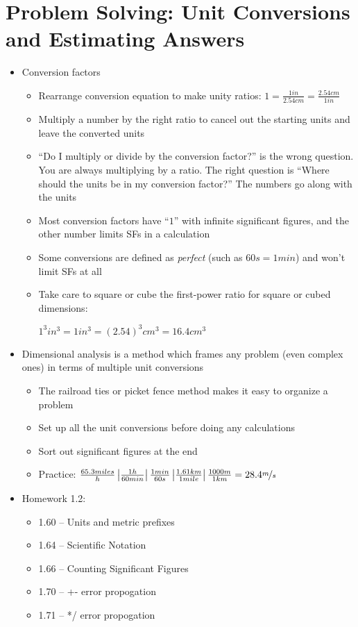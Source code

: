 \documentclass[12pt, openany, letterpaper]{memoir}
\begin{document}
\section{Problem Solving: Unit Conversions and Estimating Answers}
\begin{itemize}
	\item Conversion factors
	\begin{itemize}
		\item Rearrange conversion equation to make unity ratios: $1=\frac{1in}{2.54cm}=\frac{2.54cm}{1in}$
		\item Multiply a number by the right ratio to cancel out the starting units and leave the converted units
		\item ``Do I multiply or divide by the conversion factor?'' is the wrong question. You are always multiplying by a ratio. The right question is ``Where should the units be in my conversion factor?'' The numbers go along with the units
		\item Most conversion factors have ``$1$'' with infinite significant figures, and the other number limits SFs in a calculation
		\item Some conversions are defined as \emph{perfect} (such as $60s=1min$) and won't limit SFs at all
		\item Take care to square or cube the first-power ratio for square or cubed dimensions: 
		
		$1^3in^3=1in^3=\left(2.54\right)^3cm^3=16.4cm^3$
	\end{itemize}
	\item Dimensional analysis is a method which frames any problem (even complex ones) in terms of multiple unit conversions
	\begin{itemize}
		\item The railroad ties or picket fence method makes it easy to organize a problem
		\item Set up all the unit conversions before doing any calculations
		\item Sort out significant figures at the end
		\item Practice: $\frac{65.3miles}{h}\left|\frac{1h}{60min}\right|\frac{1min}{60s}\left|\frac{1.61km}{1mile}\right|\frac{1000m}{1km}=28.4\nicefrac{m}{s}$
	\end{itemize}
	\item Homework 1.2:
	\begin{itemize}
		\item 1.60 -- Units and metric prefixes
		\item 1.64 -- Scientific Notation
		\item 1.66 -- Counting Significant Figures
		\item 1.70 -- +- error propogation
		\item 1.71 -- */ error propogation	
	\end{itemize}
\end{itemize}
\end{document}
